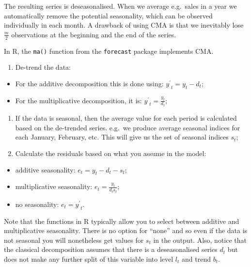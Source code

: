 \documentclass[
]{book}
\providecommand{\tightlist}{%
  \setlength{\itemsep}{0pt}\setlength{\parskip}{0pt}}
\theoremstyle{definition}
\theoremstyle{definition}
\theoremstyle{definition}
\theoremstyle{definition}
\theoremstyle{remark}
\begin{document}
The resulting series is deseasonalised. When we average e.g.~sales in a year we automatically remove the potential seasonality, which can be observed individually in each month. A drawback of using CMA is that we inevitably lose \(\frac{m}{2}\) observations at the beginning and the end of the series.

In R, the \texttt{ma()} function from the \texttt{forecast} package implements CMA.

\begin{enumerate}
\def\labelenumi{\arabic{enumi}.}
\setcounter{enumi}{2}
\tightlist
\item
  De-trend the data:
\end{enumerate}

\begin{itemize}
\tightlist
\item
  For the additive decomposition this is done using: \({y^\prime}_t = y_t - d_t\);
\item
  For the multiplicative decomposition, it is: \({y^\prime}_t = \frac{y_t}{d_t}\);
\end{itemize}

\begin{enumerate}
\def\labelenumi{\arabic{enumi}.}
\setcounter{enumi}{3}
\tightlist
\item
  If the data is seasonal, then the average value for each period is calculated based on the de-trended series. e.g.~we produce average seasonal indices for each January, February, etc. This will give us the set of seasonal indices \(s_t\);
\item
  Calculate the residuals based on what you assume in the model:
\end{enumerate}

\begin{itemize}
\tightlist
\item
  additive seasonality: \(e_t = y_t - d_t - s_t\);
\item
  multiplicative seasonality: \(e_t = \frac{y_t}{d_t s_t}\);
\item
  no seasonality: \(e_t = {y^\prime}_t\).
\end{itemize}

Note that the functions in R typically allow you to select between additive and multiplicative seasonality. There is no option for ``none'' and so even if the data is not seasonal you will nonetheless get values for \(s_t\) in the output. Also, notice that the classical decomposition assumes that there is a deseasonalised series \(d_t\) but does not make any further split of this variable into level \(l_t\) and trend \(b_t\).
\end{document}
